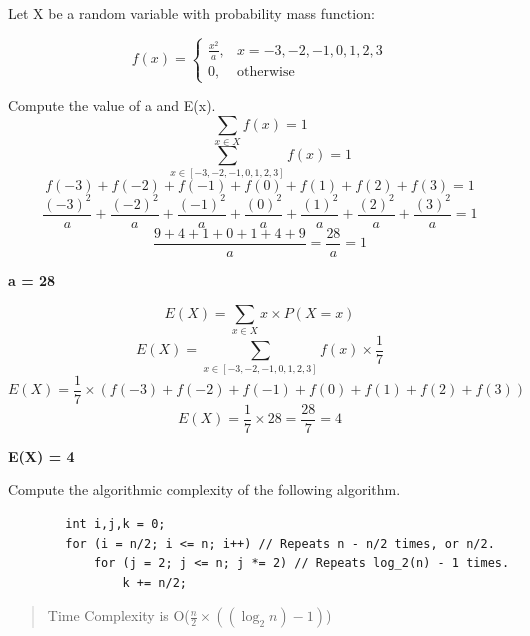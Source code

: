 \documentclass[11pt]{article}
\newenvironment{problem}[2][Problem]{\begin{trivlist}
\item[\hskip \labelsep {\bfseries #1}\hskip \labelsep {\bfseries #2.}]}{\end{trivlist}}
\begin{document}
\begin{problem}{6}
	Let X be a random variable with probability mass function:
	
	\[
		f(x) = 
		\begin{cases}
			\frac{x^2}{a},& x = -3, -2, -1, 0, 1, 2, 3\\
			0,& \text{otherwise}
		\end{cases}
	\]
	
	Compute the value of a and E(x).
	\begin{equation}
		\sum_{x \in X} f(x) = 1
	\end{equation}
	\begin{equation}
		\sum_{x \in [-3, -2, -1, 0, 1, 2, 3]} f(x) = 1
	\end{equation}
	\begin{equation}
		f(-3) + f(-2) + f(-1) + f(0) + f(1) + f(2) + f(3) = 1
	\end{equation}
	\begin{equation}
		\frac{\left(-3\right)^2}{a} + \frac{\left(-2\right)^2}{a} + \frac{\left(-1\right)^2}{a} + \frac{\left(0\right)^2}{a} + \frac{\left(1\right)^2}{a} + \frac{\left(2\right)^2}{a} + \frac{\left(3\right)^2}{a} = 1
	\end{equation}
	\begin{equation}
		\frac{9 + 4 + 1 + 0 + 1 + 4 + 9}{a} = \frac{28}{a} = 1		
	\end{equation}
	\begin{center}
		\textbf{a = 28}
	\end{center}
	\begin{equation}
		E(X) = \sum_{x \in X} x \times P(X = x)
	\end{equation}
	\begin{equation}
		E(X) = \sum_{x \in [-3, -2, -1, 0, 1, 2, 3]} f(x) \times \frac{1}{7}
	\end{equation}
	\begin{equation}
		E(X) = \frac{1}{7} \times \left(f(-3) + f(-2) + f(-1) + f(0) + f(1) + f(2) + f(3)\right)
	\end{equation}
	\begin{equation}
		E(X) = \frac{1}{7} \times 28 = \frac{28}{7} = 4
	\end{equation}
	\begin{center}
		\textbf{E(X) = 4}
	\end{center}
\end{problem}
\begin{problem}{7}
	Compute the algorithmic complexity of the following algorithm.

	\begin{lstlisting}
		int i,j,k = 0;
		for (i = n/2; i <= n; i++) // Repeats n - n/2 times, or n/2.
			for (j = 2; j <= n; j *= 2) // Repeats log_2(n) - 1 times.
				k += n/2; 
	\end{lstlisting}
	
	\begin{verse}
		Time Complexity is O($\frac{n}{2} \times \left(\left(\log_2 n\right) -1\right)$)
	\end{verse}
\end{problem}
\end{document}
